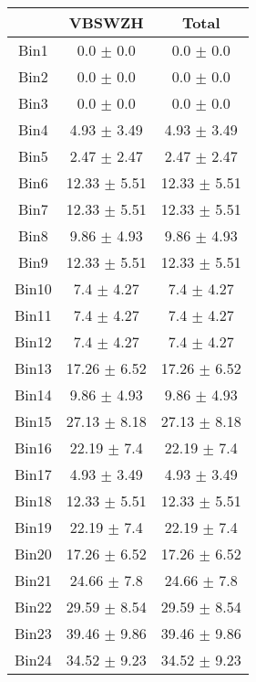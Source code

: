   \begin{tabular}{|c|c|c|}
  \hline
      & VBSWZH & Total \\ \cline{1-3} 
     \hline\hline
     Bin1 & 0.0 $\pm$ 0.0 & 0.0 $\pm$ 0.0 \\ \cline{1-3} 
     Bin2 & 0.0 $\pm$ 0.0 & 0.0 $\pm$ 0.0 \\ \cline{1-3} 
     Bin3 & 0.0 $\pm$ 0.0 & 0.0 $\pm$ 0.0 \\ \cline{1-3} 
     Bin4 & 4.93 $\pm$ 3.49 & 4.93 $\pm$ 3.49 \\ \cline{1-3} 
     Bin5 & 2.47 $\pm$ 2.47 & 2.47 $\pm$ 2.47 \\ \cline{1-3} 
     Bin6 & 12.33 $\pm$ 5.51 & 12.33 $\pm$ 5.51 \\ \cline{1-3} 
     Bin7 & 12.33 $\pm$ 5.51 & 12.33 $\pm$ 5.51 \\ \cline{1-3} 
     Bin8 & 9.86 $\pm$ 4.93 & 9.86 $\pm$ 4.93 \\ \cline{1-3} 
     Bin9 & 12.33 $\pm$ 5.51 & 12.33 $\pm$ 5.51 \\ \cline{1-3} 
     Bin10 & 7.4 $\pm$ 4.27 & 7.4 $\pm$ 4.27 \\ \cline{1-3} 
     Bin11 & 7.4 $\pm$ 4.27 & 7.4 $\pm$ 4.27 \\ \cline{1-3} 
     Bin12 & 7.4 $\pm$ 4.27 & 7.4 $\pm$ 4.27 \\ \cline{1-3} 
     Bin13 & 17.26 $\pm$ 6.52 & 17.26 $\pm$ 6.52 \\ \cline{1-3} 
     Bin14 & 9.86 $\pm$ 4.93 & 9.86 $\pm$ 4.93 \\ \cline{1-3} 
     Bin15 & 27.13 $\pm$ 8.18 & 27.13 $\pm$ 8.18 \\ \cline{1-3} 
     Bin16 & 22.19 $\pm$ 7.4 & 22.19 $\pm$ 7.4 \\ \cline{1-3} 
     Bin17 & 4.93 $\pm$ 3.49 & 4.93 $\pm$ 3.49 \\ \cline{1-3} 
     Bin18 & 12.33 $\pm$ 5.51 & 12.33 $\pm$ 5.51 \\ \cline{1-3} 
     Bin19 & 22.19 $\pm$ 7.4 & 22.19 $\pm$ 7.4 \\ \cline{1-3} 
     Bin20 & 17.26 $\pm$ 6.52 & 17.26 $\pm$ 6.52 \\ \cline{1-3} 
     Bin21 & 24.66 $\pm$ 7.8 & 24.66 $\pm$ 7.8 \\ \cline{1-3} 
     Bin22 & 29.59 $\pm$ 8.54 & 29.59 $\pm$ 8.54 \\ \cline{1-3} 
     Bin23 & 39.46 $\pm$ 9.86 & 39.46 $\pm$ 9.86 \\ \cline{1-3} 
     Bin24 & 34.52 $\pm$ 9.23 & 34.52 $\pm$ 9.23 \\ \cline{1-3} 

\end{tabular}

